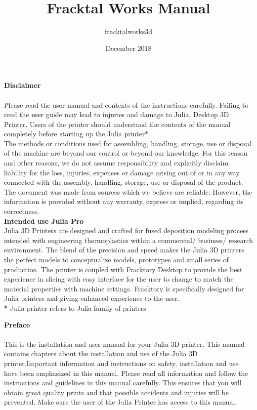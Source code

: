 \documentclass{article}
\title{Fracktal Works Manual}
\author{fracktalworks3d}
\date{December 2018}
\begin{document}
\LARGE{\textbf{Disclaimer}}\\\\
\normalsize
Please read the user manual and contents of the instructions carefully. Failing to read the user guide may lead to injuries and damage to Julia, Desktop 3D Printer. Users of the printer should understand the contents of the manual completely before starting up the Julia printer*.\\
The methods or conditions used for assembling, handling, storage, use or disposal of the machine are beyond our control or beyond our knowledge. For this reason and other reasons, we do not assume responsibility and explicitly disclaim liability for the loss, injuries, expenses or damage arising out of or in any way connected with the assembly, handling, storage, use or disposal of the product.\\
The document was made from sources which we believe are reliable. However, the information is provided without any warranty, express or implied, regarding its correctness.\\

\textbf{Intended use Julia Pro}\\
Julia 3D Printers are designed and crafted for fused deposition modeling process intended with engineering thermoplastics within a commercial/ business/ research environment. The blend of the precision and speed makes the Julia 3D printers the perfect models to conceptualize models, prototypes and small series of production. The printer is coupled with Fracktory Desktop to provide the best experience in slicing with easy interface for the user to change to match the material properties with machine settings. Fracktory is specifically designed for Julia printers and giving enhanced experience to the user.\\

* Julia printer refers to Julia family of printers

\thispagestyle{empty}
\cleardoublepage %


\LARGE{\textbf{Preface}}\\\\
\normalsize
This is the installation and user manual for your Julia 3D printer. This manual contains chapters about the installation and use of the Julia 3D printer.Important information and instructions on safety, installation and use have been emphasized in this manual. Please read all information and
follow the instructions and guidelines in this manual carefully. This ensures that you will obtain great quality prints and that possible accidents and injuries will be prevented. Make sure the user of the Julia Printer has access to this manual.
\end{document}
